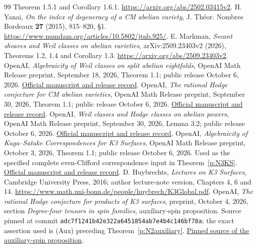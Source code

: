 \documentclass[10pt,reqno]{article}
\theoremstyle{emphasizedplain}
\theoremstyle{emphasizeddefinition}
\theoremstyle{emphasizeddefinition}
\begin{document}
\begin{thebibliography}{99}
Theorem 1.5.1 and Corollary 1.6.1.
\url{https://arxiv.org/abs/2502.03415v2}.
H. Yanai, \emph{On the index of degeneracy of a CM abelian variety},
J. Th\'eor. Nombres Bordeaux \textbf{27} (2015), 815--820, \S1.
\url{https://www.numdam.org/articles/10.5802/jtnb.925/}.
E. Markman, \emph{Secant sheaves and Weil classes on abelian varieties},
arXiv:2509.23403v2 (2026), Theorems 1.2, 1.4 and Corollary 1.3.
\url{https://arxiv.org/abs/2509.23403v2}.
OpenAI, \emph{Algebraicity of Weil classes on split abelian eightfolds},
OpenAI Math Release preprint, September 18, 2026, Theorem 1.1;
public release October 6, 2026.
\href{https://github.com/openai/math/blob/main/preprints/Algebraicity-of-Weil-classes-on-split-abelian-eightfolds-September-18-2026/README.md}{Official manuscript and release record}.
OpenAI, \emph{The rational Hodge conjecture for CM abelian varieties},
OpenAI Math Release preprint, September 30, 2026, Theorem 1.1;
public release October 6, 2026.
\href{https://github.com/openai/math/blob/main/preprints/The-rational-Hodge-conjecture-for-CM-abelian-varieties-September-30-2026/README.md}{Official manuscript and release record}.
OpenAI, \emph{Weil classes and Hodge classes on abelian powers},
OpenAI Math Release preprint, September 30, 2026, Lemma 3.2;
public release October 6, 2026.
\href{https://github.com/openai/math/blob/main/preprints/Weil-classes-and-Hodge-classes-on-abelian-powers-September-30-2026/README.md}{Official manuscript and release record}.
OpenAI, \emph{Algebraicity of Kuga--Satake Correspondences for K3 Surfaces},
OpenAI Math Release preprint, October 3, 2026, Theorem 1.1;
public release October 6, 2026. Used as the specified complete
even-Clifford correspondence input in Theorem~\ref{p:N3KS}.
\href{https://github.com/openai/math/blob/main/preprints/Algebraicity-of-Kuga-Satake-Correspondences-for-K3-Surfaces-October-3-2026/README.md}{Official manuscript and release record}.
D. Huybrechts, \emph{Lectures on K3 Surfaces}, Cambridge University
Press, 2016; author lecture-note version, Chapters 4, 6 and 14.
\url{https://www.math.uni-bonn.de/people/huybrech/K3Global.pdf}.
OpenAI, \emph{The rational Hodge conjecture for products of K3 surfaces},
preprint, October 4, 2026, section \emph{Degree-four tensors in spin
families}, auxiliary-spin proposition.
Source pinned at commit
\texttt{adc7f1241b42e322a6451854ab7e4b4c146bf78a};
the exact assertion used is (Aux) preceding
Theorem~\ref{p:N2auxiliary}.
\href{https://github.com/openai/math/blob/adc7f1241b42e322a6451854ab7e4b4c146bf78a/preprints/The-rational-Hodge-conjecture-for-products-of-K3-surfaces-October-4-2026/build/manuscript/auxiliary.tex}{Pinned source of the auxiliary-spin proposition}.
\end{thebibliography}
\end{document}
